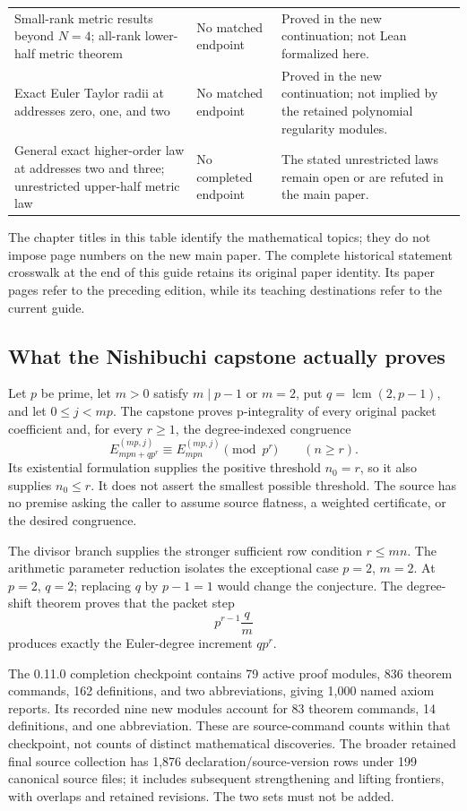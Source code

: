 \begin{longtable}{p{.32\linewidth}p{.30\linewidth}p{.29\linewidth}}
Small-rank metric results beyond $N=4$; all-rank lower-half metric theorem & No matched endpoint & Proved in the new continuation; not Lean formalized here.\\
Exact Euler Taylor radii at addresses zero, one, and two & No matched endpoint & Proved in the new continuation; not implied by the retained polynomial regularity modules.\\
General exact higher-order law at addresses two and three; unrestricted upper-half metric law & No completed endpoint & The stated unrestricted laws remain open or are refuted in the main paper.\\
\bottomrule\end{longtable}

The chapter titles in this table identify the mathematical topics; they do not impose page numbers on the new main paper. The complete historical statement crosswalk at the end of this guide retains its original paper identity. Its paper pages refer to the preceding edition, while its teaching destinations refer to the current guide.

\subsection{What the Nishibuchi capstone actually proves}
Let $p$ be prime, let $m>0$ satisfy $m\mid p-1$ or $m=2$, put $q=\operatorname{lcm}(2,p-1)$, and let $0\le j<mp$. The capstone proves p-integrality of every original packet coefficient and, for every $r\ge1$, the degree-indexed congruence
\[
 E_{mpn+qp^r}^{(mp,j)}\equiv E_{mpn}^{(mp,j)}\pmod{p^r}
 \qquad(n\ge r).
\]
Its existential formulation supplies the positive threshold $n_0=r$, so it also supplies $n_0\le r$. It does not assert the smallest possible threshold. The source has no premise asking the caller to assume source flatness, a weighted certificate, or the desired congruence.

The divisor branch supplies the stronger sufficient row condition $r\le mn$. The arithmetic parameter reduction isolates the exceptional case $p=2$, $m=2$. At $p=2$, $q=2$; replacing $q$ by $p-1=1$ would change the conjecture. The degree-shift theorem proves that the packet step
\[
 p^{r-1}\frac{q}{m}
\]
produces exactly the Euler-degree increment $qp^r$.

The 0.11.0 completion checkpoint contains 79 active proof modules, 836 theorem commands, 162 definitions, and two abbreviations, giving 1,000 named axiom reports. Its recorded nine new modules account for 83 theorem commands, 14 definitions, and one abbreviation. These are source-command counts within that checkpoint, not counts of distinct mathematical discoveries. The broader retained final source collection has 1,876 declaration/source-version rows under 199 canonical source files; it includes subsequent strengthening and lifting frontiers, with overlaps and retained revisions. The two sets must not be added.

